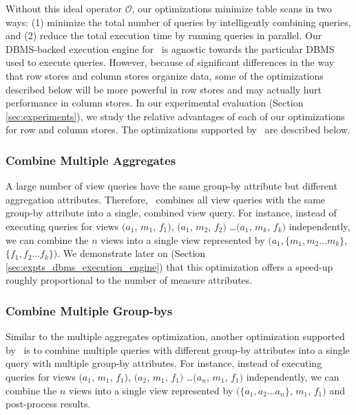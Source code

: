 Without this ideal operator $\mathcal{O}$,
our optimizations minimize table scans in two ways: (1) minimize the total number of
queries by intelligently combining queries, and (2) reduce the total
execution time by running queries in parallel. 
Our DBMS-backed execution engine for \SeeDB\ is agnostic towards the
particular DBMS used to execute queries.
However, because of significant differences in the way that row stores and
column stores organize data, some of the optimizations described below
will be more powerful in row stores and may actually hurt performance in column
stores. In our experimental evaluation (Section \ref{sec:experiments}), we study
the relative advantages of each of our optimizations for row and column stores.
The optimizations supported by \SeeDB\ are described below.

\subsubsection {Combine Multiple Aggregates} 
A large number of view queries have the same group-by attribute but different
aggregation attributes. 
Therefore, \SeeDB\ combines all view queries with the same
group-by attribute into a single, combined view query. For instance, instead of executing
queries for views $(a_1$, $m_1$, $f_1)$, $(a_1$, $m_2$, $f_2)$ \ldots $(a_1$, $m_k$, $f_k)$
independently, we can combine the $n$ views into a single view represented by
$(a_1, \{m_1, m_2\ldots m_k\}$, $\{f_1, f_2\ldots f_k\})$. We demonstrate later
on (Section \ref{sec:expts_dbms_execution_engine})  that this optimization
offers a speed-up roughly proportional to the number of measure attributes.

\subsubsection {Combine Multiple Group-bys}
\label{subsec:mult_gb}
  Similar to the multiple aggregates optimization, another optimization
  supported by \SeeDB\ is to combine multiple queries with different group-by
  attributes into a single query with multiple group-by attributes.
  For instance, instead of executing queries for views $(a_1$, $m_1$, $f_1)$,
  $(a_2$, $m_1$, $f_1)$ \ldots $(a_n$, $m_1$, $f_1)$ independently, we can
  combine the $n$ views into a single view represented by $(\{a_1, a_2\ldots
  a_n\}$, $m_1$, $f_1)$ and post-process results.

